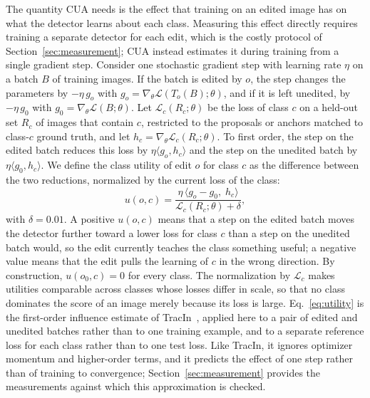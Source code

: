 The quantity CUA needs is the effect that training on an edited image has on what the detector learns about each class. Measuring this effect directly requires training a separate detector for each edit, which is the costly protocol of Section~\ref{sec:measurement}; CUA instead estimates it during training from a single gradient step. Consider one stochastic gradient step with learning rate $\eta$ on a batch $B$ of training images. If the batch is edited by $o$, the step changes the parameters by $-\eta\,g_o$ with $g_o=\nabla_\theta\mathcal{L}(T_o(B);\theta)$, and if it is left unedited, by $-\eta\,g_0$ with $g_0=\nabla_\theta\mathcal{L}(B;\theta)$. Let $\mathcal{L}_c(R_c;\theta)$ be the loss of class $c$ on a held-out set $R_c$ of images that contain $c$, restricted to the proposals or anchors matched to class-$c$ ground truth, and let $h_c=\nabla_\theta\mathcal{L}_c(R_c;\theta)$. To first order, the step on the edited batch reduces this loss by $\eta\langle g_o,h_c\rangle$ and the step on the unedited batch by $\eta\langle g_0,h_c\rangle$. We define the class utility of edit $o$ for class $c$ as the difference between the two reductions, normalized by the current loss of the class:
\begin{equation}
u(o,c)=\frac{\eta\,\langle g_o-g_0,\;h_c\rangle}{\mathcal{L}_c(R_c;\theta)+\delta},
\label{eq:utility}
\end{equation}
with $\delta=0.01$. A positive $u(o,c)$ means that a step on the edited batch moves the detector further toward a lower loss for class $c$ than a step on the unedited batch would, so the edit currently teaches the class something useful; a negative value means that the edit pulls the learning of $c$ in the wrong direction. By construction, $u(o_0,c)=0$ for every class. The normalization by $\mathcal{L}_c$ makes utilities comparable across classes whose losses differ in scale, so that no class dominates the score of an image merely because its loss is large. Eq.~\eqref{eq:utility} is the first-order influence estimate of TracIn~\cite{pruthi2020tracin}, applied here to a pair of edited and unedited batches rather than to one training example, and to a separate reference loss for each class rather than to one test loss. Like TracIn, it ignores optimizer momentum and higher-order terms, and it predicts the effect of one step rather than of training to convergence; Section~\ref{sec:measurement} provides the measurements against which this approximation is checked.

